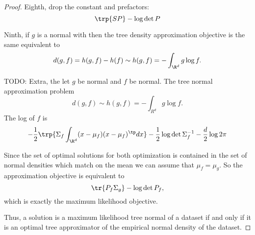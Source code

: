 \begin{prop}
\begin{proof}
Eighth, drop the constant and prefactors:
$$
  \trp{SP} - \log \det P
$$

Ninth, if $g$ is a normal with then the tree density approximation objective is the same equivalent to
$$
  d(g, f) = h(g, f) - h(f) \sim h(g, f) = - \int_{\R^d} g\log f.
$$

TODO:
Extra, the let $g$ be normal and $f$ be normal. The tree normal approximation problem
$$
  d(g, f) \sim h(g, f) = - \int_{R^d} g \log f.
$$
The log of $f$ is
$$
  - \frac{1}{2} \trp{ \Sigma_f \int_{\R^d} (x - \mu_f)(x - \mu_f)^{\tp} dx } - \frac{1}{2} \log \det \Sigma_f^{-1} - \frac{d}{2} \log 2\pi
$$

Since the set of optimal solutions for both optimization is contained in the set of normal densities which match on the mean we can assume that $\mu_f = \mu_g$.
So the approximation objective is equivalent to
$$
  \tr{P_f \Sigma_g} - \log \det P_f,
$$
which is exactly the maximum likelihood objective.

Thus, a solution is a maximum likelihood tree normal of a dataset if and only if it is an optimal tree approximator of the empirical normal density of the dataset.

\end{proof}

\end{prop}
\strats
